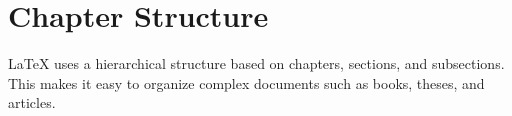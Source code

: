 \section{Chapter Structure}
LaTeX uses a hierarchical structure based on chapters, sections, and subsections. This makes it easy to organize complex documents such as books, theses, and articles.

